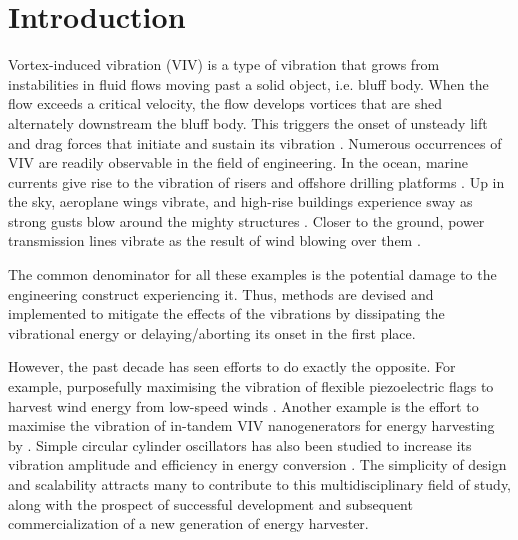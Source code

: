 \documentclass[oneside]{utmthesis}
\begin{document}
\listofappendices


\mainmatter

\captionsetup[figure]{labelsep=quad}
\captionsetup[table]{labelsep=quad}

\chapter{Introduction} \label{chap:introduction}
Vortex-induced vibration (VIV) is a type of vibration that grows from instabilities in fluid flows moving past a solid object, i.e. bluff body. When the flow exceeds a critical velocity, the flow develops vortices that are shed alternately downstream the bluff body. This triggers the onset of unsteady lift and drag forces that initiate and sustain its vibration \citep{Bukka2020}. Numerous occurrences of VIV are readily observable in the field of engineering. In the ocean, marine currents give rise to the vibration of risers and offshore drilling platforms \citep{Liu2020,Zhang2020,Meng2020}. Up in the sky, aeroplane wings vibrate, and high-rise buildings experience sway as strong gusts blow around the mighty structures \citep{Arul2020,Hao2020,Gao2020}. Closer to the ground, power transmission lines vibrate as the result of wind blowing over them \citep{Wang2019,Gomez-Ortega2019}.

The common denominator for all these examples is the potential damage to the engineering construct experiencing it. Thus, methods are devised and implemented to mitigate the effects of the vibrations by dissipating the vibrational energy or delaying/aborting its onset in the first place.

However, the past decade has seen efforts to do exactly the opposite. For example, purposefully maximising the vibration of flexible piezoelectric flags to harvest wind energy from low-speed winds \citep{Mehdipour2022}. Another example is the effort to maximise the vibration of in-tandem VIV nanogenerators for energy harvesting by \citep{Zhang2022a}. Simple circular cylinder oscillators has also been studied to increase its vibration amplitude and efficiency in energy conversion \citep{Zhang2022b}.
The simplicity of design and scalability attracts many to contribute to this multidisciplinary field of study, along with the prospect of successful development and subsequent commercialization of a new generation of energy harvester.
\end{document}

